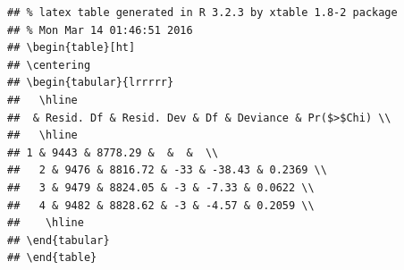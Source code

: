 \documentclass{article}\usepackage[]{graphicx}\usepackage[]{color}
\makeatletter
\newenvironment{kframe}{%
 \def\at@end@of@kframe{}%
 \ifinner\ifhmode%
  \def\at@end@of@kframe{\end{minipage}}%
  \begin{minipage}{\columnwidth}%
 \fi\fi%
 \def\FrameCommand##1{\hskip\@totalleftmargin \hskip-\fboxsep
 \colorbox{shadecolor}{##1}\hskip-\fboxsep
     \hskip-\linewidth \hskip-\@totalleftmargin \hskip\columnwidth}%
 \MakeFramed {\advance\hsize-\width
   \@totalleftmargin\z@ \linewidth\hsize
   \@setminipage}}%
 {\par\unskip\endMakeFramed%
 \at@end@of@kframe}
\newenvironment{knitrout}{}{} %
\makeatother
\begin{document}
\begin{knitrout}
\begin{kframe}
\begin{alltt}
\end{alltt}
\begin{verbatim}
## % latex table generated in R 3.2.3 by xtable 1.8-2 package
## % Mon Mar 14 01:46:51 2016
## \begin{table}[ht]
## \centering
## \begin{tabular}{lrrrrr}
##   \hline
##  & Resid. Df & Resid. Dev & Df & Deviance & Pr($>$Chi) \\ 
##   \hline
## 1 & 9443 & 8778.29 &  &  &  \\ 
##   2 & 9476 & 8816.72 & -33 & -38.43 & 0.2369 \\ 
##   3 & 9479 & 8824.05 & -3 & -7.33 & 0.0622 \\ 
##   4 & 9482 & 8828.62 & -3 & -4.57 & 0.2059 \\ 
##    \hline
## \end{tabular}
## \end{table}
\end{verbatim}
\end{kframe}
\end{knitrout}
\end{document}
